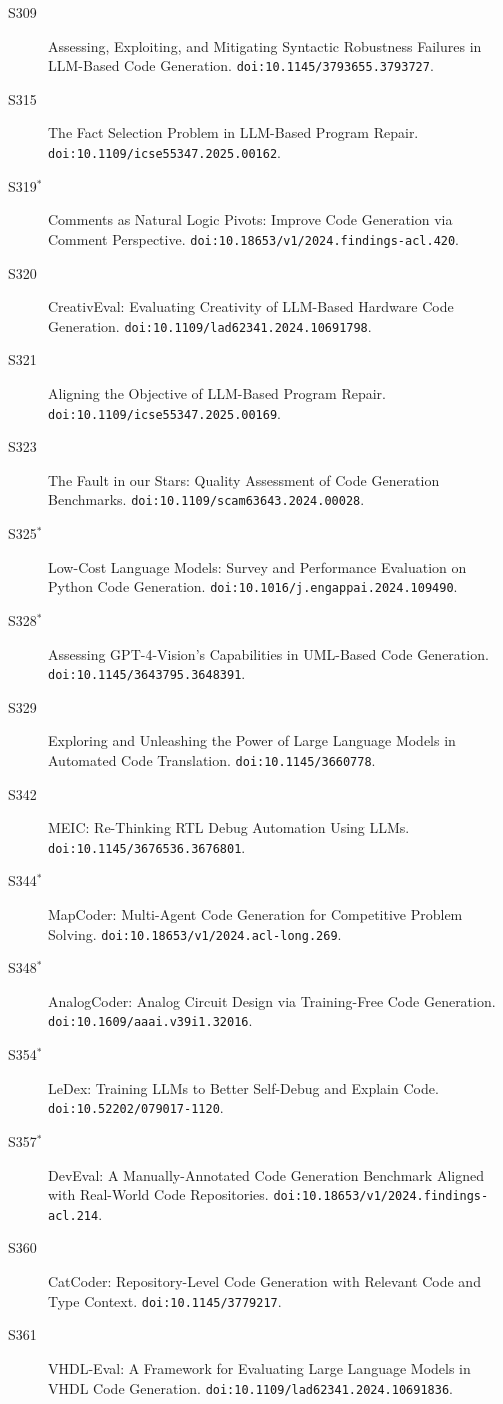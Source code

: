 {\begin{description}
\item[S309] Assessing, Exploiting, and Mitigating Syntactic Robustness Failures in LLM-Based Code Generation. \texttt{doi:10.1145/3793655.3793727}.
\item[S315] The Fact Selection Problem in LLM-Based Program Repair. \texttt{doi:10.1109/icse55347.2025.00162}.
\item[S319$^\ast$] Comments as Natural Logic Pivots: Improve Code Generation via Comment Perspective. \texttt{doi:10.18653/v1/2024.findings-acl.420}.
\item[S320] CreativEval: Evaluating Creativity of LLM-Based Hardware Code Generation. \texttt{doi:10.1109/lad62341.2024.10691798}.
\item[S321] Aligning the Objective of LLM-Based Program Repair. \texttt{doi:10.1109/icse55347.2025.00169}.
\item[S323] The Fault in our Stars: Quality Assessment of Code Generation Benchmarks. \texttt{doi:10.1109/scam63643.2024.00028}.
\item[S325$^\ast$] Low-Cost Language Models: Survey and Performance Evaluation on Python Code Generation. \texttt{doi:10.1016/j.engappai.2024.109490}.
\item[S328$^\ast$] Assessing GPT-4-Vision's Capabilities in UML-Based Code Generation. \texttt{doi:10.1145/3643795.3648391}.
\item[S329] Exploring and Unleashing the Power of Large Language Models in Automated Code Translation. \texttt{doi:10.1145/3660778}.
\item[S342] MEIC: Re-Thinking RTL Debug Automation Using LLMs. \texttt{doi:10.1145/3676536.3676801}.
\item[S344$^\ast$] MapCoder: Multi-Agent Code Generation for Competitive Problem Solving. \texttt{doi:10.18653/v1/2024.acl-long.269}.
\item[S348$^\ast$] AnalogCoder: Analog Circuit Design via Training-Free Code Generation. \texttt{doi:10.1609/aaai.v39i1.32016}.
\item[S354$^\ast$] LeDex: Training LLMs to Better Self-Debug and Explain Code. \texttt{doi:10.52202/079017-1120}.
\item[S357$^\ast$] DevEval: A Manually-Annotated Code Generation Benchmark Aligned with Real-World Code Repositories. \texttt{doi:10.18653/v1/2024.findings-acl.214}.
\item[S360] CatCoder: Repository-Level Code Generation with Relevant Code and Type Context. \texttt{doi:10.1145/3779217}.
\item[S361] VHDL-Eval: A Framework for Evaluating Large Language Models in VHDL Code Generation. \texttt{doi:10.1109/lad62341.2024.10691836}.

\end{description}}
